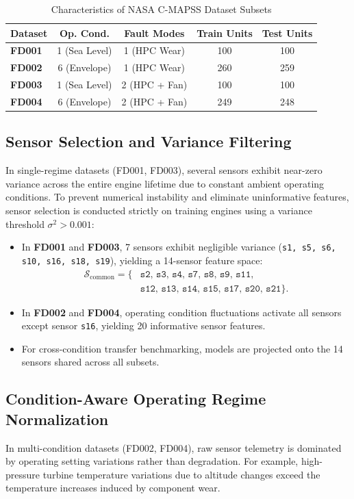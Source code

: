 \begin{table}[htbp]
\centering
\caption{Characteristics of NASA C-MAPSS Dataset Subsets}
\label{tab:cmapss_subsets}
\begin{tabular}{lcccc}
\toprule
\textbf{Dataset} & \textbf{Op. Cond.} & \textbf{Fault Modes} & \textbf{Train Units} & \textbf{Test Units} \\
\midrule
\textbf{FD001} & 1 (Sea Level) & 1 (HPC Wear) & 100 & 100 \\
\textbf{FD002} & 6 (Envelope) & 1 (HPC Wear) & 260 & 259 \\
\textbf{FD003} & 1 (Sea Level) & 2 (HPC + Fan) & 100 & 100 \\
\textbf{FD004} & 6 (Envelope) & 2 (HPC + Fan) & 249 & 248 \\
\bottomrule
\end{tabular}
\end{table}

\subsection{Sensor Selection and Variance Filtering}
In single-regime datasets (FD001, FD003), several sensors exhibit near-zero variance across the entire engine lifetime due to constant ambient operating conditions. To prevent numerical instability and eliminate uninformative features, sensor selection is conducted strictly on training engines using a variance threshold $\sigma^2 > 0.001$:
\begin{itemize}
    \item In \textbf{FD001} and \textbf{FD003}, 7 sensors exhibit negligible variance (\texttt{s1, s5, s6, s10, s16, s18, s19}), yielding a 14-sensor feature space:
    \begin{align*}
    \mathcal{S}_{\text{common}} = \{&\texttt{s2, s3, s4, s7, s8, s9, s11}, \\
    &\texttt{s12, s13, s14, s15, s17, s20, s21}\}.
    \end{align*}
    \item In \textbf{FD002} and \textbf{FD004}, operating condition fluctuations activate all sensors except sensor \texttt{s16}, yielding 20 informative sensor features.
    \item For cross-condition transfer benchmarking, models are projected onto the 14 sensors shared across all subsets.
\end{itemize}

\subsection{Condition-Aware Operating Regime Normalization}
In multi-condition datasets (FD002, FD004), raw sensor telemetry is dominated by operating setting variations rather than degradation. For example, high-pressure turbine temperature variations due to altitude changes exceed the temperature increases induced by component wear.

